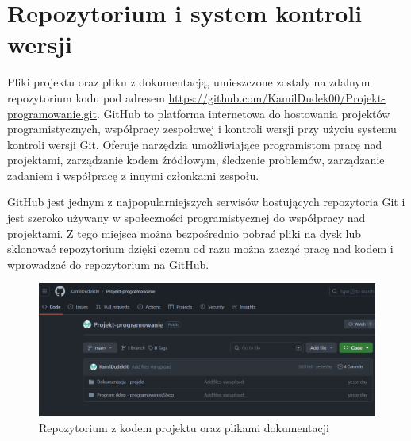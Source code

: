 ﻿\chapter{Repozytorium i system kontroli wersji}

Pliki projektu oraz pliku z dokumentacją, umieszczone zostaly na zdalnym repozytorium kodu pod adresem \href{https://github.com/KamilDudek00/Projekt-programowanie.git}{https://github.com/KamilDudek00/Projekt-programowanie.git}. GitHub to platforma internetowa do hostowania projektów programistycznych, współpracy zespołowej i kontroli wersji przy użyciu systemu kontroli wersji Git. Oferuje narzędzia umożliwiające programistom pracę nad projektami, zarządzanie kodem źródłowym, śledzenie problemów, zarządzanie zadaniem i współpracę z innymi członkami zespołu.\newline 

GitHub jest jednym z najpopularniejszych serwisów hostujących repozytoria Git i jest szeroko używany w społeczności programistycznej do współpracy nad projektami. Z tego miejsca można bezpośrednio pobrać pliki na dysk lub sklonować repozytorium dzięki czemu od razu można zacząć pracę nad kodem i wprowadzać do repozytorium na GitHub.

\begin{figure}[!ht]
	\centering
		\includegraphics[width=15cm]{screeny/repo.png}
	\caption{\footnotesize Repozytorium z kodem projektu oraz plikami dokumentacji}
	\label{fig:plotend}
\end{figure}